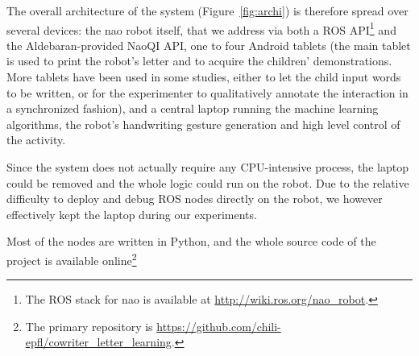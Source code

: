 \documentclass{article}
\begin{document}
The overall architecture of the system (Figure~\ref{fig:archi}) is therefore
spread over several devices: the {\sc nao} robot itself, that we address via
both a ROS API\footnote{The ROS stack for {\sc nao} is available at
\url{http://wiki.ros.org/nao_robot}.} and the Aldebaran-provided NaoQI API, one
to four Android tablets (the main tablet is used to print the robot's letter and
to acquire the children' demonstrations. More tablets have been used in some
studies, either to let the child input words to be written, or for the
experimenter to qualitatively annotate the interaction in a synchronized
fashion), and a central laptop running the machine learning algorithms, the
robot's handwriting gesture generation and high level control of the activity.

Since the system does not actually require any CPU-intensive process, the laptop
could be removed and the whole logic could run on the robot. Due to the relative
difficulty to deploy and debug ROS nodes directly on the robot, we however
effectively kept the laptop during our experiments.

Most of the nodes are written in Python, and the whole source code of the
project is available online\footnote{The primary repository is
\url{https://github.com/chili-epfl/cowriter_letter_learning}.}
\end{document}
